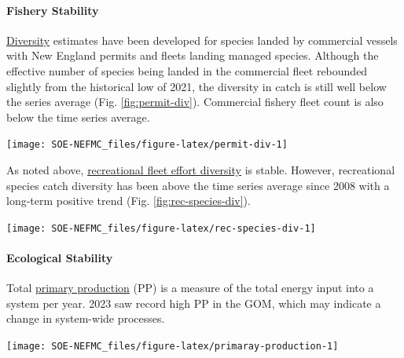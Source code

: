 \documentclass[
  10pt,
]{article}
\let\origfigure\figure
\let\endorigfigure\endfigure
\renewenvironment{figure}[1][2] {
    \expandafter\origfigure\expandafter[H]
} {
    \endorigfigure
}
\begin{document}
\hypertarget{fishery-stability}{%
\paragraph{Fishery Stability}\label{fishery-stability}}

\href{https://noaa-edab.github.io/catalog/commercial_div.html}{Diversity} estimates have been developed for species landed by commercial vessels with New England permits and fleets landing managed species. Although the effective number of species being landed in the commercial fleet rebounded slightly from the historical low of 2021, the diversity in catch is still well below the series average (Fig. \ref{fig:permit-div}). Commercial fishery fleet count is also below the time series average.

\begin{figure}

{\centering \texttt{[image: SOE-NEFMC\_files/figure-latex/permit-div-1]} 

}

\caption{Species revenue diversity in New England.}\label{fig:permit-div}
\end{figure}

As noted above, \href{https://noaa-edab.github.io/catalog/recdat.html}{recreational fleet effort diversity} is stable. However, recreational species catch diversity has been above the time series average since 2008 with a long-term positive trend (Fig. \ref{fig:rec-species-div}).

\begin{figure}

{\centering \texttt{[image: SOE-NEFMC\_files/figure-latex/rec-species-div-1]} 

}

\caption{Diversity of recreational catch in New England.}\label{fig:rec-species-div}
\end{figure}

\hypertarget{ecological-stability}{%
\paragraph{Ecological Stability}\label{ecological-stability}}

Total \href{https://noaa-edab.github.io/catalog/chl_pp.html}{primary production} (PP) is a measure of the total energy input into a system per year. 2023 saw record high PP in the GOM, which may indicate a change in system-wide processes.

\begin{figure}

{\centering \texttt{[image: SOE-NEFMC\_files/figure-latex/primaray-production-1]} 

}

\caption{Total areal annual primary production by ecological production unit. The dashed line represents the long-term (1998-2023) annual mean.}\label{fig:primaray-production}
\end{figure}
\end{document}

